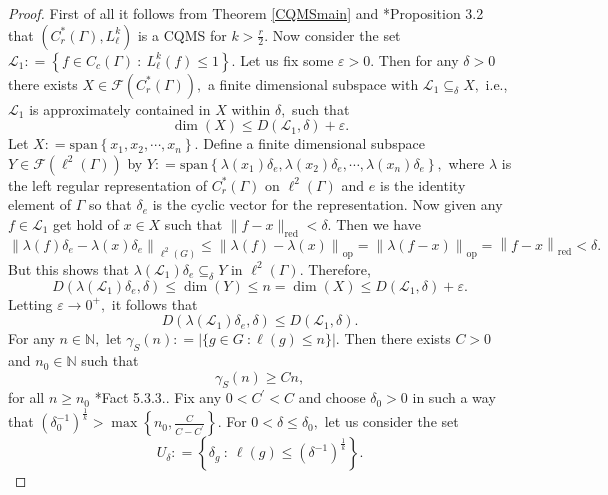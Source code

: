 \documentclass[a4paper,11pt,reqno]{amsart}
\theoremstyle{plain}
\theoremstyle{mainthmstyle}
\theoremstyle{named}
\numberwithin{equation}{section}
\begin{document}
\begin{proof}
 First of all it follows from Theorem \ref{CQMSmain} and \cite{nica2010degree}*{Proposition 3.2} that $\left (C_r^{\ast} (\Gamma), L_{\ell}^{k} \right )$ is a CQMS for $k > \frac {r} {2}.$ Now consider the set $\mathcal L_{1} : = \left \{f \in C_{c} (\Gamma)\ :\ L_{\ell}^{k} (f) \leq 1 \right \}.$ Let us fix some $\varepsilon > 0.$ Then for any $\delta > 0$ there exists $X \in \mathcal {F} \left (C_r^{\ast} (\Gamma) \right ),$ a finite dimensional subspace with $\mathcal L_{1} \subseteq_{\delta} X,$ i.e., $\mathcal L_{1}$ is approximately contained in $X$ within $\delta,$ such that $$\dim (X) \leq D \left (\mathcal L_{1}, \delta \right ) + \varepsilon.$$ Let $X : = \mathrm {span} \left \{x_{1}, x_{2}, \cdots, x_{n} \right \}.$ Define a finite dimensional subspace $Y \in \mathcal F \left (\ell^{2} (\Gamma) \right )$ by $Y : = \mathrm {span} \left \{\lambda \left (x_{1} \right ) \delta_{e}, \lambda \left (x_{2} \right ) \delta_{e}, \cdots, \lambda \left (x_{n} \right ) \delta_{e} \right \},$ where $\lambda$ is the left regular representation of $C_{r}^{\ast} (\Gamma)$ on $\ell^{2} (\Gamma)$ and $e$ is the identity element of $\Gamma$ so that $\delta_{e}$ is the cyclic vector for the representation. Now given any $f \in \mathcal L_{1}$ get hold of $x \in X$ such that $\|f - x\|_{\mathrm {red}} < \delta.$ Then we have $$\left \|\lambda (f) \delta_{e} - \lambda (x) \delta_{e} \right \|_{\ell^{2} (G)} \leq \left \|\lambda (f) - \lambda (x) \right \|_{\mathrm {op}} = \left \|\lambda (f - x) \right \|_{\mathrm {op}} = \left \|f - x \right \|_{\mathrm {red}} < \delta.$$ But this shows that $\lambda(\mathcal L_{1})\delta_{e} \subseteq_{\delta} Y$ in $\ell^{2} (\Gamma).$ Therefore, $$D \left (\lambda(\mathcal L_{1})\delta_{e}, \delta \right ) \leq \dim (Y) \leq n = \dim (X) \leq D \left (\mathcal L_{1}, \delta \right ) + \varepsilon.$$ Letting $\varepsilon \rightarrow 0^{+},$ it follows that $$D \left (\lambda(\mathcal L_{1})\delta_{e}, \delta \right ) \leq D \left (\mathcal L_{1}, \delta \right ).$$
For any $n \in \mathbb N,$ let $\gamma_S (n) : = \left \lvert \{g \in G\ :\ell (g) \leq n \} \right \rvert.$ Then there exists $C > 0$ and $n_0 \in \mathbb N$ such that $$\gamma_S (n) \geq C n,$$ for all $n \geq n_0$ \cite{Dikranjan2013TopologicalEA}*{Fact 5.3.3.}. Fix any $0 < C^{\prime} < C$ and choose $\delta_0 > 0$ in such a way that $\left (\delta_{0}^{-1} \right )^{\frac {1} {k}} > \max \left \{n_0, \frac {C} {C - C^{\prime}} \right \}.$
For $0 < \delta \leq \delta_0,$ let us consider the set $$U_{\delta} : = \left \{\delta_{g} \ :\ \ell (g) \leq \left (\delta^{-1} \right )^{\frac {1} {k}} \right \}.$$ 

\end{proof}
\end{document}
